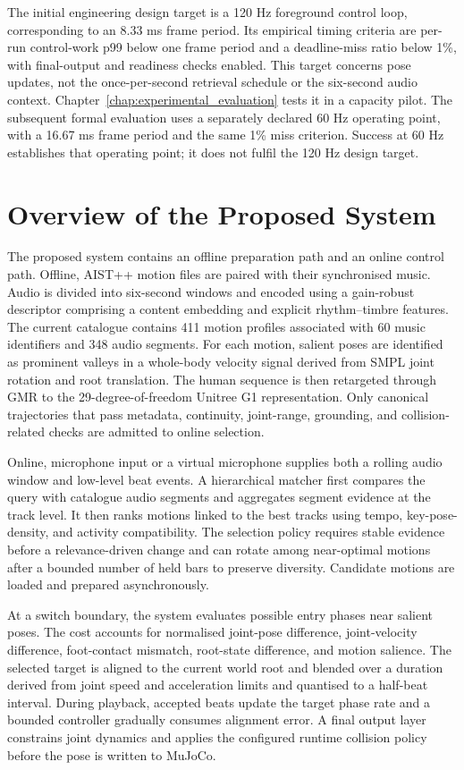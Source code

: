 The initial engineering design target is a 120 Hz foreground control loop,
corresponding to an 8.33 ms frame period. Its empirical timing criteria are
per-run control-work p99 below one frame period and a deadline-miss ratio below
1\%, with final-output and readiness checks enabled. This target concerns pose
updates, not the once-per-second retrieval schedule or the six-second audio
context. Chapter~\ref{chap:experimental_evaluation} tests it in a capacity pilot.
The subsequent formal evaluation uses a separately declared 60 Hz operating
point, with a 16.67 ms frame period and the same 1\% miss criterion. Success at
60 Hz establishes that operating point; it does not fulfil the 120 Hz design
target.



\section{Overview of the Proposed System}
\label{sec:intro_system}

The proposed system contains an offline preparation path and an online control
path. Offline, AIST++ motion files are paired with their synchronised music.
Audio is divided into six-second windows and encoded using a gain-robust
descriptor comprising a content embedding and explicit rhythm--timbre
features. The current catalogue contains 411 motion profiles associated with
60 music identifiers and 348 audio segments. For each motion, salient poses
are identified as prominent valleys in a whole-body velocity signal derived
from SMPL joint rotation and root translation. The human sequence is then
retargeted through GMR to the 29-degree-of-freedom Unitree G1 representation.
Only canonical trajectories that pass metadata, continuity, joint-range,
grounding, and collision-related checks are admitted to online selection.

Online, microphone input or a virtual microphone supplies both a rolling audio
window and low-level beat events. A hierarchical matcher first compares the
query with catalogue audio segments and aggregates segment evidence at the
track level. It then ranks motions linked to the best tracks using tempo,
key-pose-density, and activity compatibility. The selection policy requires
stable evidence before a relevance-driven change and can rotate among
near-optimal motions after a bounded number of held bars to preserve diversity.
Candidate motions are loaded and prepared asynchronously.

At a switch boundary, the system evaluates possible entry phases near salient
poses. The cost accounts for normalised joint-pose difference, joint-velocity
difference, foot-contact mismatch, root-state difference, and motion salience.
The selected target is aligned to the current world root and blended over a
duration derived from joint speed and acceleration limits and quantised to a
half-beat interval. During playback, accepted beats update the target phase
rate and a bounded controller gradually consumes alignment error. A final
output layer constrains joint dynamics and applies the configured runtime
collision policy before the pose is written to MuJoCo.

